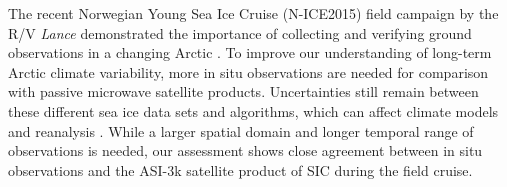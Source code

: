 \documentclass[draft,linenumbers]{agujournal}
\begin{document}
The recent Norwegian Young Sea Ice Cruise (N-ICE2015) field campaign by the R/V \textit{Lance} demonstrated the importance of collecting and verifying ground observations in a changing Arctic \citep[e.g.,][]{Granskog2016, Graham2017}. To improve our understanding of long-term Arctic climate variability, more in situ observations are needed for comparison with passive microwave satellite products. Uncertainties still remain between these different sea ice data sets and algorithms, which can affect climate models and reanalysis \citep{Bunzel2016, Ivanova2015}. While a larger spatial domain and longer temporal range of observations is needed, our assessment shows close agreement between in situ observations and the ASI-3k satellite product of SIC during the field cruise.


%
%
%
%
%
%
%
%
\end{document}
